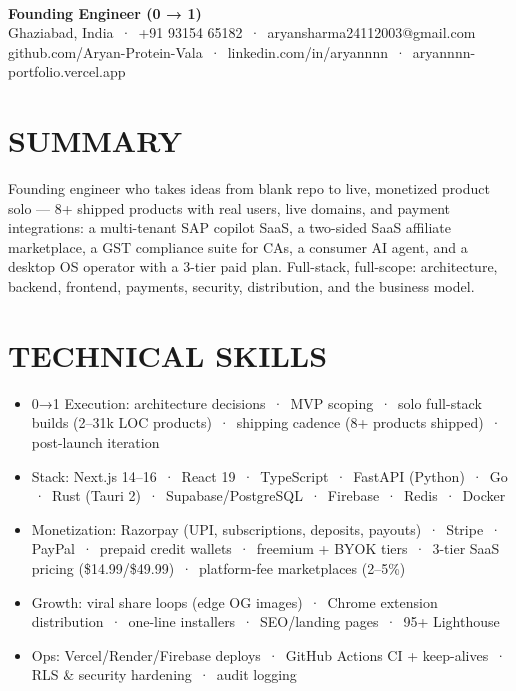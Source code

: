\documentclass[9pt]{article}
\begin{document}
\\[3pt]
{\large\bfseries Founding Engineer (0 → 1)}\\[3pt]
{\small\color{greyc} Ghaziabad, India \,·\, +91 93154 65182 \,·\, aryansharma24112003@gmail.com}\vspace{-2pt}
{\small\color{greyc} github.com/Aryan-Protein-Vala \,·\, linkedin.com/in/aryannnn \,·\, aryannnn-portfolio.vercel.app}\vspace{-2pt}
\section*{SUMMARY}
Founding engineer who takes ideas from blank repo to live, monetized product solo  ---  8+ shipped products with real users, live domains, and payment integrations: a multi-tenant SAP copilot SaaS, a two-sided SaaS affiliate marketplace, a GST compliance suite for CAs, a consumer AI agent, and a desktop OS operator with a 3-tier paid plan. Full-stack, full-scope: architecture, backend, frontend, payments, security, distribution, and the business model.
\vspace{1pt}
\section*{TECHNICAL SKILLS}
\begin{itemize}[leftmargin=11pt,itemsep=0pt,topsep=1pt,parsep=0pt]
\item 0→1 Execution: architecture decisions \,·\, MVP scoping \,·\, solo full-stack builds (2–31k LOC products) \,·\, shipping cadence (8+ products shipped) \,·\, post-launch iteration
\item Stack: Next.js 14–16 \,·\, React 19 \,·\, TypeScript \,·\, FastAPI (Python) \,·\, Go \,·\, Rust (Tauri 2) \,·\, Supabase/PostgreSQL \,·\, Firebase \,·\, Redis \,·\, Docker
\item Monetization: Razorpay (UPI, subscriptions, deposits, payouts) \,·\, Stripe \,·\, PayPal \,·\, prepaid credit wallets \,·\, freemium + BYOK tiers \,·\, 3-tier SaaS pricing (\$14.99/\$49.99) \,·\, platform-fee marketplaces (2–5\%)
\item Growth: viral share loops (edge OG images) \,·\, Chrome extension distribution \,·\, one-line installers \,·\, SEO/landing pages \,·\, 95+ Lighthouse
\item Ops: Vercel/Render/Firebase deploys \,·\, GitHub Actions CI + keep-alives \,·\, RLS \& security hardening \,·\, audit logging
\end{itemize}
\end{document}
